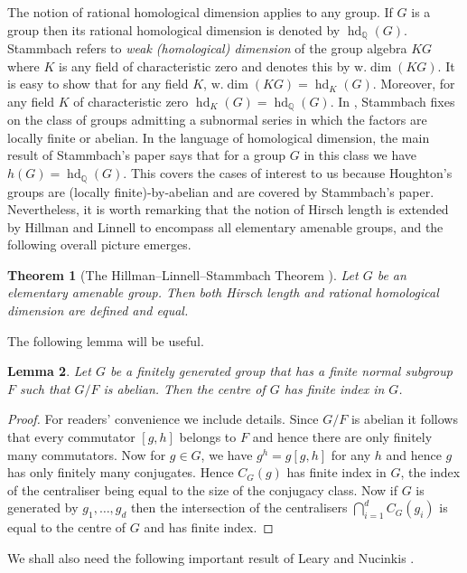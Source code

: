 \documentclass[11pt,a4paper]{amsart}
\newtheorem{theorem}{Theorem}[section]
\newtheorem{lemma}[theorem]{Lemma}
\theoremstyle{definition}
\theoremstyle{remark}
\newcommand{\hd}{\operatorname{hd}}
\newcommand{\Q}{\mathbb Q}
\begin{document}
The notion of rational homological dimension applies to any group. If $G$ is a group then its rational homological dimension is denoted by $\hd_\Q(G)$. 
Stammbach \cite{Stammbach} refers to \emph{weak (homological) dimension} of the group algebra $KG$ where $K$ is any field of characteristic zero and denotes this by $\mathrm{w}.\dim(KG)$. It is easy to show that for any field $K$, $\mathrm{w}.\dim(KG) = \hd_K(G)$. Moreover, for any field $K$ of characteristic zero $\hd_K(G)=\hd_\Q(G)$. 
In \cite{Stammbach}, Stammbach fixes on the class of groups admitting a subnormal series in which the factors are locally finite or abelian. 
In the language of homological dimension, the main result of Stammbach's paper \cite{Stammbach} says that for a group $G$ in this class we have $h(G)=\hd_\Q(G)$. This covers the cases of interest to us because Houghton's groups are (locally finite)-by-abelian and are covered by Stammbach's paper. Nevertheless, it is worth remarking that the notion of Hirsch length is extended by Hillman and Linnell to encompass all elementary amenable groups, and the following overall picture emerges.

\begin{theorem}[The Hillman--Linnell--Stammbach Theorem \cite{HL,Stammbach}]
Let $G$ be an elementary amenable group. Then both Hirsch length and rational homological dimension are defined and equal. 
\end{theorem}

The following lemma will be useful.

\begin{lemma}\label{finite-by-abelian_groups}
Let $G$ be a finitely generated group that has a finite normal subgroup $F$ such that $G/F$ is abelian. Then the centre of $G$ has finite index in $G$.
\end{lemma}
\begin{proof}
For readers' convenience we include details. 
Since $G/F$ is abelian it follows that every commutator $[g,h]$ belongs to $F$ and hence there are only finitely many commutators. Now for $g\in G$, we have $g^h=g[g,h]$ for any $h$ and hence $g$ has only finitely many conjugates. Hence $C_G(g)$ has finite index in $G$, the index of the centraliser being equal to the size of the conjugacy class. Now if $G$ is generated by $g_1,\dots,g_d$ then the intersection of the centralisers 
$\bigcap_{i=1}^dC_G(g_i)$ is equal to the centre of $G$ and has finite index.
\end{proof}

We shall also need the following important result of Leary and Nucinkis \cite{Leary2001}.
\end{document}
